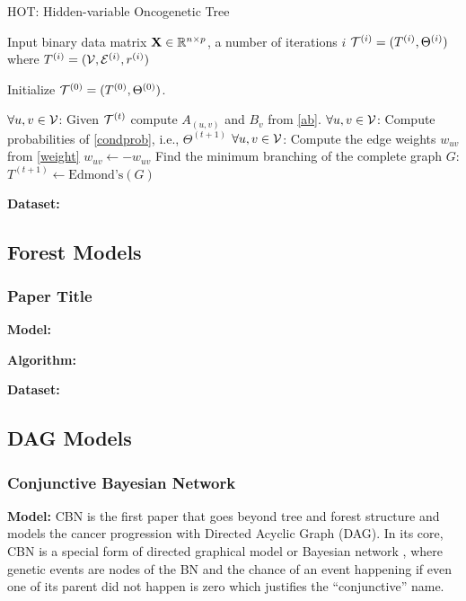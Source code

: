 	\begin{algorithm}[t]
		\caption{HOT: Hidden-variable Oncogenetic Tree}
		\label{alg4}
		\begin{algorithmic}[1]
			 Input binary data matrix $\mathbf{X} \in \mathbb R^{n \times p}$, a number of iterations $i$
			 ${\cal T}^{(i)} = (T^{(i)}, \Theta^{(i)})$ where $T^{(i)} = ({\cal V}, {\cal E}^{(i)}, r^{(i)})$
			
			\STATE Initialize ${\cal T}^{(0)} = (T^{(0)}, \Theta^{(0)})$.
			
			\STATE $\forall u,v \in {\cal V}$: Given ${\cal T}^{(t)}$ compute $A_{(u,v)}$ and $B_{v}$  from \eqref{ab}.  
			\STATE $\forall u,v \in {\cal V}$: Compute probabilities of \eqref{condprob}, i.e., $\Theta^{(t+1)}$
			\STATE $\forall u,v \in {\cal V}$: Compute the edge weights $w_{uv}$ from \eqref{weight}
			\STATE $w_{uv} \leftarrow - w_{uv}$
			\STATE Find the minimum branching of the complete graph $G$: $T^{(t+1)} \leftarrow \text{Edmond's}(G)$
			\ENDFOR 
		\end{algorithmic}
	\end{algorithm}
	
	
	{\bf Dataset:}
	
	
	\subsection{Forest Models}
	
	\subsubsection{Paper Title}
	{\bf Model:}
	
	{\bf Algorithm:}
	
	{\bf Dataset:}
	
	
	\subsection{DAG Models}

	\subsubsection{Conjunctive Bayesian Network \cite{beerenwinkel07}}
	{\bf Model:}
	CBN \cite{beerenwinkel07} is the first paper that goes beyond tree and forest structure and models the cancer progression with Directed Acyclic Graph (DAG). 
	In its core, CBN is a special form of directed graphical model or Bayesian network \cite{?}, where genetic events are nodes of the BN and the chance of an event happening if even one of its parent did not happen is zero which justifies the ``conjunctive'' name. 
	
